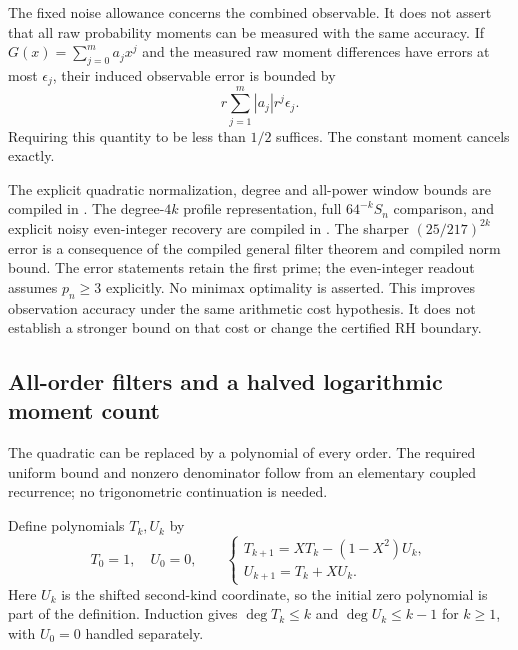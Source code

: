 \documentclass[11pt]{article}
\theoremstyle{definition}
\begin{document}
The fixed noise allowance concerns the combined observable.
It does not assert that all raw probability moments can be measured
with the same accuracy. If $G(x)=\sum_{j=0}^{m}a_jx^j$ and the measured
raw moment differences have errors at most $\epsilon_j$, their induced
observable error is bounded by
\[
 r\sum_{j=1}^{m}|a_j|r^j\epsilon_j.
\]
Requiring this quantity to be less than $1/2$ suffices.
The constant moment cancels exactly.

\begin{flushleft}
The explicit quadratic normalization, degree and all-power window bounds
are compiled in
.
The degree-$4k$ profile representation, full $64^{-k}S_n$ comparison,
and explicit noisy even-integer recovery are compiled in
.
The sharper $(25/217)^{2k}$ error is a consequence of the compiled
general filter theorem and compiled norm bound.
The error statements retain the first prime; the even-integer readout
assumes $p_n\ge3$ explicitly. No minimax optimality is asserted.
This improves observation accuracy under the same arithmetic cost
hypothesis. It does not establish a stronger bound on that cost or
change the certified RH boundary.
\end{flushleft}

\subsection{All-order filters and a halved logarithmic moment count}

The quadratic can be replaced by a polynomial of every order.
The required uniform bound and nonzero denominator follow from an
elementary coupled recurrence; no trigonometric continuation is needed.

Define polynomials $T_k,U_k$ by
\[
 T_0=1,\quad U_0=0,\qquad
 \begin{cases}
 T_{k+1}=XT_k-(1-X^2)U_k,\\
 U_{k+1}=T_k+XU_k.
 \end{cases}
\]
Here $U_k$ is the shifted second-kind coordinate, so the initial
zero polynomial is part of the definition.
Induction gives $\deg T_k\le k$ and $\deg U_k\le k-1$ for $k\ge1$,
with $U_0=0$ handled separately.
\end{document}
